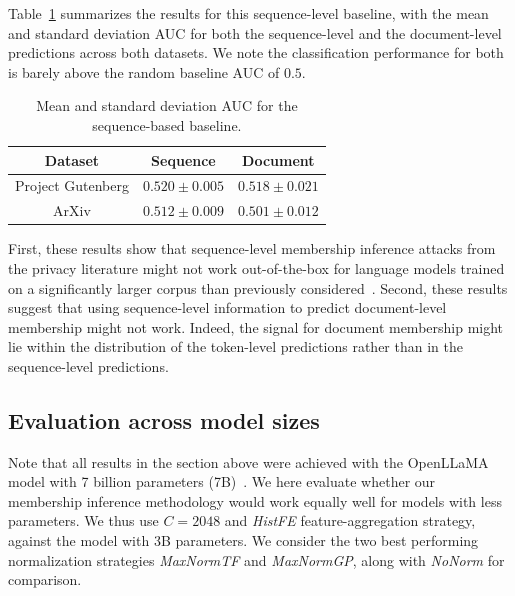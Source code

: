 \documentclass[twocolumn,10pt]{article}
\begin{document}
Table~\ref{tab:sentence_baseline} summarizes the results for this sequence-level baseline, with the mean and standard deviation AUC for both the sequence-level and the document-level predictions across both datasets. We note the classification performance for both is barely above the random baseline AUC of $0.5$. 

\begin{table}[t]
    \centering
    \begin{tabular}{ccc}
    \toprule
        Dataset & Sequence & Document \\
        \midrule 
        Project Gutenberg & $0.520 \pm 0.005$ & $0.518 \pm 0.021$ \\ 
        \cmidrule{2-3}
        ArXiv & $0.512 \pm 0.009 $ & $0.501 \pm 0.012$ \\ 
        \bottomrule
    \end{tabular}
    \caption{Mean and standard deviation AUC for the sequence-based baseline.}
    \label{tab:sentence_baseline}
\end{table}

First, these results show that sequence-level membership inference attacks from the privacy literature might not work out-of-the-box for language models trained on a significantly larger corpus than previously considered~\cite{carlini2022membership,carlini2021extracting,mattern2023membership}.
Second, these results suggest that using sequence-level information to predict document-level membership might not work. Indeed, the signal for document membership might lie within the distribution of the token-level predictions rather than in the sequence-level predictions.

\subsection{Evaluation across model sizes}\label{sec:model-size-evaluation}

Note that all results in the section above were achieved with the OpenLLaMA model with 7 billion parameters (7B)~\cite{openlm2023openllama}. We here evaluate whether our membership inference methodology would work equally well for models with less parameters. We thus use $C=2048$ and \textit{HistFE} feature-aggregation strategy, against the model with 3B parameters. We consider the two best performing normalization strategies \textit{MaxNormTF} and \textit{MaxNormGP}, along with \textit{NoNorm} for comparison.
\end{document}
